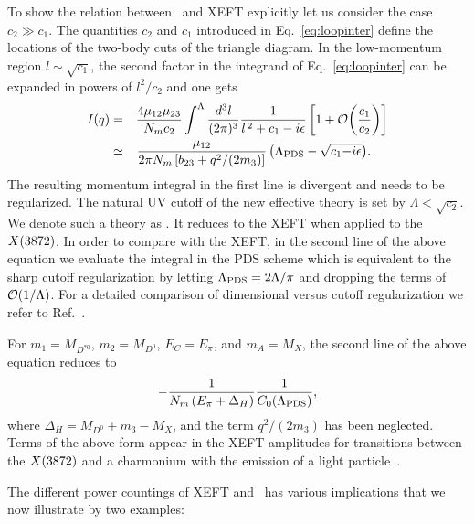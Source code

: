 To show the relation between \nreft~and XEFT explicitly let us consider the case 
$c_2\gg c_1$.
The quantities $c_2$ and $c_1$  introduced in Eq.~\eqref{eq:loopinter} define
 the locations of the two-body cuts of the triangle diagram. In the low-momentum region $l\sim \sqrt{c_1}$, 
 the second factor in the integrand of Eq.~\eqref{eq:loopinter} can 
be expanded in powers of $l^2/c_2$ and one gets
\begin{eqnarray}
  I(q) &=& \frac{4\mu_{12}\mu_{23}}{N_m c_2} \int^\Lambda \frac{d^3
l}{(2\pi)^3}\frac1{{l}^{\,2} + c_1 -i\epsilon} \left[1+ \mathcal{O}\!\left(\frac{c_1}{c_2}\right)\!\, 
\right] \nonumber\\
&\simeq& \frac{\mu_{12}}{2\pi N_m  \left[b_{23} + q^2/(2 m_3) \right] }  \left(\Lambda_{\rm PDS} -\sqrt{c_1 {-}i\epsilon} \right)\!.
~~~~
\end{eqnarray}
The resulting momentum integral in the first line is divergent
 and  needs to be regularized. The 
natural UV cutoff of the new effective theory
is set by $\Lambda<\sqrt{c_2}$. We denote such a theory as 
\nreftii. It reduces to the XEFT when applied to the $X(3872)$. In order to compare 
with the XEFT, in the second line of the above equation we evaluate the 
integral in the PDS scheme which is equivalent to the sharp cutoff 
regularization by letting $\Lambda_{\rm PDS}= 2 \Lambda/\pi$ and dropping the 
terms of $\mathcal{O}\!\left(1/\Lambda\right)\!\,$. For a detailed comparison of 
dimensional versus cutoff regularization we refer to
Ref.~\cite{Phillips:1998uy}.

For $m_{1}=M_{D^{*0}}$, $m_2=M_{D^0}$, $E_C=E_\pi$, and $m_A=M_X$, the second 
line of the above equation reduces to 
\begin{equation}
  -\frac1{N_m \left(E_\pi + \Delta_H \right)} \frac1{ 
C_{0}(\Lambda_{\rm PDS} ) },
\end{equation}
where $\Delta_H=M_{D^0}+m_3-M_X$, and the term $q^2/(2m_3)$ has been neglected. 
Terms of the above form appear in the XEFT amplitudes for transitions between 
the $X(3872)$ and a charmonium with the emission of a light 
particle~\cite{Fleming:2008yn,Fleming:2011xa,Mehen:2011ds,Margaryan:2013tta}.

The different power countings of XEFT and \nreft~has various implications 
that we now illustrate by two examples:

